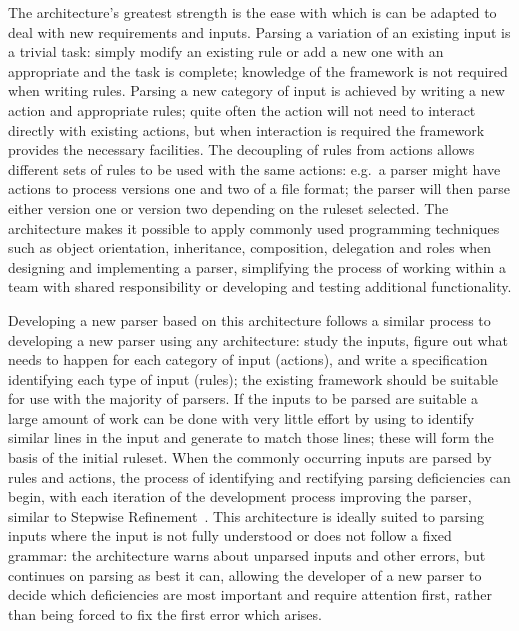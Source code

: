\documentclass[draft]{svmult}
\begin{document}
The architecture's greatest strength is the ease with which is can be
adapted to deal with new requirements and inputs.  Parsing a variation of
an existing input is a trivial task: simply modify an existing rule or add
a new one with an appropriate \regex{} and the task is complete; knowledge
of the framework is not required when writing rules.  Parsing a new
category of input is achieved by writing a new action and appropriate
rules; quite often the action will not need to interact directly with
existing actions, but when interaction is required the framework provides
the necessary facilities.  The decoupling of rules from actions allows
different sets of rules to be used with the same actions: e.g.\ a parser
might have actions to process versions one and two of a file format; the
parser will then parse either version one or version two depending on the
ruleset selected.  The architecture makes it possible to apply commonly
used programming techniques such as object orientation, inheritance,
composition, delegation and roles when designing and implementing a parser,
simplifying the process of working within a team with shared responsibility
or developing and testing additional functionality.

Developing a new parser based on this architecture follows a similar
process to developing a new parser using any architecture: study the
inputs, figure out what needs to happen for each category of input
(actions), and write a specification identifying each type of input
(rules); the existing framework should be suitable for use with the
majority of parsers.  If the inputs to be parsed are suitable a large
amount of work can be done with very little effort by using \SLCT{} to
identify similar lines in the input and generate \regexes{} to match those
lines; these \regexes{} will form the basis of the initial ruleset.  When
the commonly occurring inputs are parsed by rules and actions, the process
of identifying and rectifying parsing deficiencies can begin, with each
iteration of the development process improving the parser, similar to
Stepwise Refinement~\cite{stepwise-refinement}.  This architecture is
ideally suited to parsing inputs where the input is not fully understood or
does not follow a fixed grammar: the architecture warns about unparsed
inputs and other errors, but continues on parsing as best it can, allowing
the developer of a new parser to decide which deficiencies are most
important and require attention first, rather than being forced to fix the
first error which arises.
\end{document}
